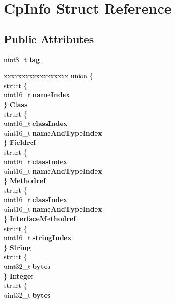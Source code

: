 \hypertarget{structCpInfo}{}\section{Cp\+Info Struct Reference}
\label{structCpInfo}
\subsection*{Public Attributes}
\begin{DoxyCompactItemize}
\item 
\mbox{\label{structCpInfo_ac20d96c33f871bde2e903708a215a2dc}} 
uint8\+\_\+t {\bfseries tag}
\item 
\mbox{\label{structCpInfo_a67bf62f1bfb88277813bff0a1524a854}} 
\begin{tabbing}
xx\=xx\=xx\=xx\=xx\=xx\=xx\=xx\=xx\=\kill
union \{\\
\>struct \{\\
\>\>uint16\_t {\bfseries nameIndex}\\
\>\} {\bfseries Class}\\
\>struct \{\\
\>\>uint16\_t {\bfseries classIndex}\\
\>\>uint16\_t {\bfseries nameAndTypeIndex}\\
\>\} {\bfseries Fieldref}\\
\>struct \{\\
\>\>uint16\_t {\bfseries classIndex}\\
\>\>uint16\_t {\bfseries nameAndTypeIndex}\\
\>\} {\bfseries Methodref}\\
\>struct \{\\
\>\>uint16\_t {\bfseries classIndex}\\
\>\>uint16\_t {\bfseries nameAndTypeIndex}\\
\>\} {\bfseries InterfaceMethodref}\\
\>struct \{\\
\>\>uint16\_t {\bfseries stringIndex}\\
\>\} {\bfseries String}\\
\>struct \{\\
\>\>uint32\_t {\bfseries bytes}\\
\>\} {\bfseries Integer}\\
\>struct \{\\
\>\>uint32\_t {\bfseries bytes}\\

\end{tabbing}
\end{DoxyCompactItemize}
